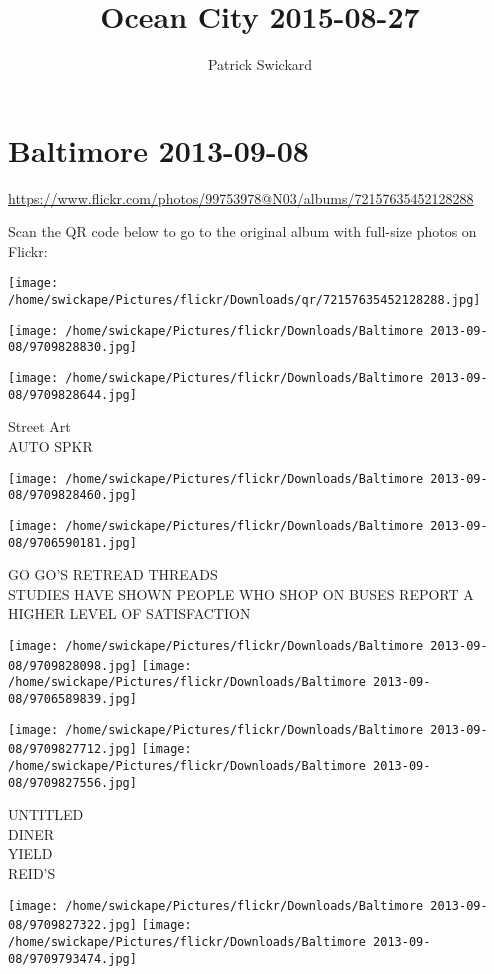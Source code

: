 \documentclass[10pt,letterpaper]{article}
\title{Ocean City 2015-08-27}
\author{Patrick Swickard}
\date{}
\begin{document}
\section*{Baltimore 2013-09-08}

\url{https://www.flickr.com/photos/99753978@N03/albums/72157635452128288}

Scan the QR code below to go to the original album with full-size photos on Flickr:

\texttt{[image: /home/swickape/Pictures/flickr/Downloads/qr/72157635452128288.jpg]}
\pagebreak

\texttt{[image: /home/swickape/Pictures/flickr/Downloads/Baltimore 2013-09-08/9709828830.jpg]}

\vspace{0.25in}
\texttt{[image: /home/swickape/Pictures/flickr/Downloads/Baltimore 2013-09-08/9709828644.jpg]}

Street Art\\
AUTO SPKR
\pagebreak

\texttt{[image: /home/swickape/Pictures/flickr/Downloads/Baltimore 2013-09-08/9709828460.jpg]}

\vspace{0.25in}
\texttt{[image: /home/swickape/Pictures/flickr/Downloads/Baltimore 2013-09-08/9706590181.jpg]}

GO GO'S RETREAD THREADS\\
STUDIES HAVE SHOWN PEOPLE WHO SHOP ON BUSES REPORT A HIGHER LEVEL OF SATISFACTION
\pagebreak

\texttt{[image: /home/swickape/Pictures/flickr/Downloads/Baltimore 2013-09-08/9709828098.jpg]}
\texttt{[image: /home/swickape/Pictures/flickr/Downloads/Baltimore 2013-09-08/9706589839.jpg]}

\texttt{[image: /home/swickape/Pictures/flickr/Downloads/Baltimore 2013-09-08/9709827712.jpg]}
\texttt{[image: /home/swickape/Pictures/flickr/Downloads/Baltimore 2013-09-08/9709827556.jpg]}

UNTITLED\\
DINER\\
YIELD\\
REID'S
\pagebreak

\texttt{[image: /home/swickape/Pictures/flickr/Downloads/Baltimore 2013-09-08/9709827322.jpg]}
\texttt{[image: /home/swickape/Pictures/flickr/Downloads/Baltimore 2013-09-08/9709793474.jpg]}
\end{document}
